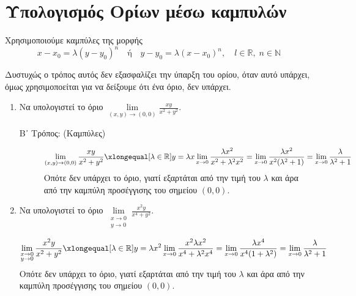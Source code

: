 \section{Υπολογισμός Ορίων μέσω καμπυλών}

Χρησιμοποιούμε καμπύλες της μορφής 
\[ 
    x - x_{0} = \lambda (y- y_{0})^{n} \quad \text{ή} 
    \quad y- y_{0} = \lambda (x- x_{0})^{n}, \quad l \in \mathbb{R}, \; n \in 
    \mathbb{N}  
\]

\begin{rem}
    Δυστυχώς ο τρόπος αυτός δεν εξασφαλίζει την ύπαρξη του ορίου, όταν αυτό υπάρχει, 
    όμως χρησιμοποείται για να δείξουμε ότι ένα όριο, δεν υπάρχει.
\end{rem}

\begin{examples}
\item {}
    \begin{enumerate}

        \item Να υπολογιστεί το όριο $ \lim\limits_{(x,y)\to (0, 0)} 
            \frac{xy}{x^{2}+y^{2}} $.
            \begin{description}
                \item [Β᾽ Τρόπος: (Καμπύλες)]
                    \[
                        \lim\limits_{(x,y)\to (0, 0)} \frac{xy}{x^{2}+y^{2}} 
                        \xlongequal[\lambda \in \mathbb{R}]{y= \lambda x} \lim_{x \to 0}
                        \frac{\lambda x^{2}}{x^{2}+ \lambda^{2} x^{2}} = \lim_{x \to 0} 
                        \frac{\lambda x^{2}}{x^{2}(\lambda ^{2}+1)} = \lim_{x \to 0} 
                        \frac{\lambda}{\lambda ^{2}+1} 
                    \]
                    Οπότε δεν υπάρχει το όριο, γιατί εξαρτάται από την τιμή του 
                    $ \lambda $ και άρα από την καμπύλη προσέγγισης του σημείου 
                    $ (0,0) $.
            \end{description}
        \item Να υπολογιστεί το όριο $ \lim\limits_{\substack{x\to 0 \\y \to 0}}
            \frac{x^{2}y}{x^{4}+y^{2}} $.

            \begin{solution}
                \[
                    \lim\limits_{\substack{x\to 0 \\y \to 0}} 
                    \frac{x^{2}y}{x^{2}+y^{2}} 
                    \xlongequal[\lambda \in \mathbb{R}]{y= \lambda x^{2}} 
                    \lim_{x \to 0} \frac{x^{2} \lambda x^{2}}
                    {x^{4}+\lambda^{2}x^{4}} = \lim_{x\to 0} 
                    \frac{\lambda x^{4}}{x^{4}(1+\lambda ^{2})} = 
                    \lim_{x \to 0} \frac{\lambda}{\lambda ^{2}+1} 
                \] 
                Οπότε δεν υπάρχει το όριο, γιατί εξαρτάται από την τιμή του $ \lambda $ 
                και άρα από την καμπύλη προσέγγισης του σημείου $ (0,0) $.
            \end{solution}


\end{enumerate}
\end{examples}
